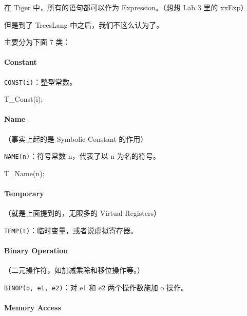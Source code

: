 \documentclass[
]{article}
\newenvironment{Shaded}{}{}
\newcommand{\NormalTok}[1]{#1}
\begin{document}
在 Tiger 中，所有的语句都可以作为 Expression。（想想 Lab 3 里的 xxExp）

但是到了 TreesLang 中之后，我们不这么认为了。

主要分为下面 7 类：

\hypertarget{header-n28}{%
\paragraph{Constant}\label{header-n28}}

\texttt{CONST(i)}：整型常数。

\begin{Shaded}
\begin{Highlighting}[]
\NormalTok{T_Const(i);}
\end{Highlighting}
\end{Shaded}

\hypertarget{header-n31}{%
\paragraph{Name}\label{header-n31}}

（事实上起的是 Symbolic Constant 的作用）

\texttt{NAME(n)}：符号常数 n，代表了以 n 为名的符号。

\begin{Shaded}
\begin{Highlighting}[]
\NormalTok{T_Name(n);}
\end{Highlighting}
\end{Shaded}

\hypertarget{header-n35}{%
\paragraph{Temporary}\label{header-n35}}

（就是上面提到的，无限多的 Virtual Registers）

\texttt{TEMP(t)}：临时变量，或者说虚拟寄存器。

\hypertarget{header-n38}{%
\paragraph{Binary Operation}\label{header-n38}}

（二元操作符，如加减乘除和移位操作等。）

\texttt{BINOP(o,\ e1,\ e2)}：对 e1 和 e2 两个操作数施加 o 操作。

\hypertarget{header-n41}{%
\paragraph{Memory Access}\label{header-n41}}
\end{document}
